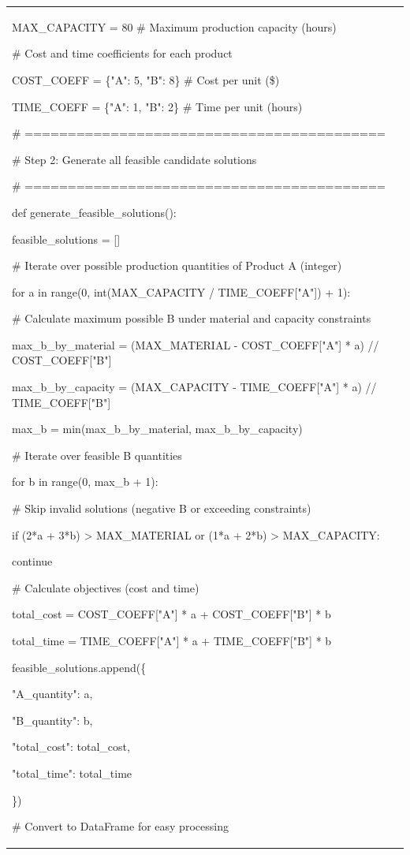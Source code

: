\begin{longtable}[]{@{}
  >{\raggedright\arraybackslash}p{}@{}}
MAX\_CAPACITY = 80 \# Maximum production capacity (hours)

\# Cost and time coefficients for each product

COST\_COEFF = \{"A": 5, "B": 8\} \# Cost per unit (\$)

TIME\_COEFF = \{"A": 1, "B": 2\} \# Time per unit (hours)

\# ==========================================

\# Step 2: Generate all feasible candidate solutions

\# ==========================================

def generate\_feasible\_solutions():

feasible\_solutions = {[}{]}

\# Iterate over possible production quantities of Product A (integer)

for a in range(0, int(MAX\_CAPACITY / TIME\_COEFF{[}"A"{]}) + 1):

\# Calculate maximum possible B under material and capacity constraints

max\_b\_by\_material = (MAX\_MATERIAL - COST\_COEFF{[}"A"{]} * a) //
COST\_COEFF{[}"B"{]}

max\_b\_by\_capacity = (MAX\_CAPACITY - TIME\_COEFF{[}"A"{]} * a) //
TIME\_COEFF{[}"B"{]}

max\_b = min(max\_b\_by\_material, max\_b\_by\_capacity)

\# Iterate over feasible B quantities

for b in range(0, max\_b + 1):

\# Skip invalid solutions (negative B or exceeding constraints)

if (2*a + 3*b) \textgreater{} MAX\_MATERIAL or (1*a + 2*b)
\textgreater{} MAX\_CAPACITY:

continue

\# Calculate objectives (cost and time)

total\_cost = COST\_COEFF{[}"A"{]} * a + COST\_COEFF{[}"B"{]} * b

total\_time = TIME\_COEFF{[}"A"{]} * a + TIME\_COEFF{[}"B"{]} * b

feasible\_solutions.append(\{

"A\_quantity": a,

"B\_quantity": b,

"total\_cost": total\_cost,

"total\_time": total\_time

\})

\# Convert to DataFrame for easy processing


\end{longtable}
